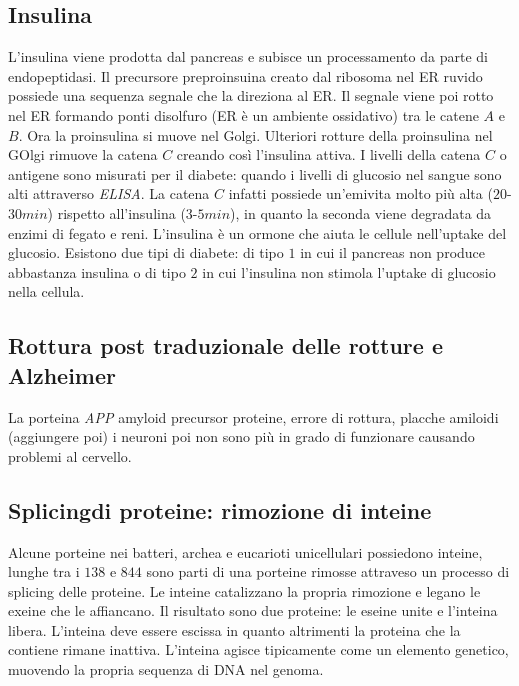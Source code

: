 \subsection{Insulina}
L'insulina viene prodotta dal pancreas e subisce un processamento da parte di endopeptidasi. Il precursore preproinsuina creato dal ribosoma nel ER ruvido possiede una sequenza segnale che la direziona al ER. Il segnale
viene poi rotto nel ER formando ponti disolfuro (ER \`e un ambiente ossidativo) tra le catene $A$ e $B$. Ora la proinsulina si muove nel Golgi. Ulteriori rotture della proinsulina nel GOlgi rimuove la catena $C$ creando
cos\`i l'insulina attiva. I livelli della catena $C$ o antigene sono misurati per il diabete: quando i livelli di glucosio nel sangue sono alti attraverso \emph{ELISA}. La catena $C$ infatti possiede un'emivita molto pi\`u
alta ($20$-$30min$) rispetto all'insulina ($3$-$5min$), in quanto la seconda viene degradata da enzimi di fegato e reni. L'insulina \`e un ormone che aiuta le cellule nell'uptake del glucosio. Esistono due tipi di diabete:
di tipo $1$ in cui il pancreas non produce abbastanza insulina o di tipo $2$ in cui l'insulina non stimola l'uptake di glucosio nella cellula. 
\subsection{Rottura post traduzionale delle rotture e Alzheimer}
La porteina \emph{APP} amyloid precursor proteine, errore di rottura, placche amiloidi (aggiungere poi) 
i neuroni poi non sono pi\`u in grado di funzionare causando problemi al cervello. 
\subsection{Splicingdi proteine: rimozione di inteine}
Alcune porteine nei batteri, archea e eucarioti unicellulari possiedono inteine, lunghe tra i $138$ e $844$ sono parti di una porteine rimosse attraveso un processo di splicing delle proteine. Le inteine catalizzano la 
propria rimozione e legano le exeine che le affiancano. Il risultato sono due proteine: le eseine unite e l'inteina libera. L'inteina deve essere escissa in quanto altrimenti la proteina che la contiene rimane inattiva. 
L'inteina agisce tipicamente come un elemento genetico, muovendo la propria sequenza di DNA nel genoma. 
